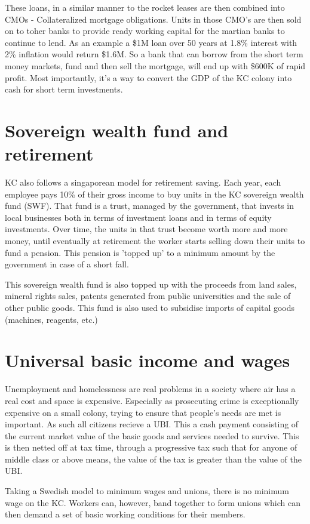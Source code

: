 \documentclass[10pt]{article}
\begin{document}
These loans, in a similar manner to the rocket leases are then combined into CMOs - Collateralized mortgage obligations. Units in those CMO's are then sold on to toher banks to provide ready working capital for the martian banks to continue to lend. As an example a \$1M loan over 50 years at 1.8\% interest with 2\% inflation would return \$1.6M. So a bank that can borrow from the short term money markets, fund and then sell the mortgage, will end up with \$600K of rapid profit. Most importantly, it's a way to convert the GDP of the KC colony into cash for short term investments.

\section{Sovereign wealth fund and retirement}
KC also follows a singaporean model for retirement saving. Each year, each employee pays 10\% of their gross income to buy units in the KC sovereign wealth fund (SWF). That fund is a trust, managed by the government, that invests in local businesses both in terms of investment loans and in terms of equity investments. Over time, the units in that trust become worth more and more money, until eventually at retirement the worker starts selling down their units to fund a pension. This pension is 'topped up' to a minimum amount by the government in case of a short fall.

This sovereign wealth fund is also topped up with the proceeds from land sales, mineral rights sales, patents generated from public universities and the sale of other public goods. This fund is also used to subsidise imports of capital goods (machines, reagents, etc.)

\section{Universal basic income and wages}
Unemployment and homelessness are real problems in a society where air has a real cost and space is expensive. Especially as prosecuting crime is exceptionally expensive on a small colony, trying to ensure that people's needs are met is important. As such all citizens recieve a UBI. This a cash payment consisting of the current market value of the basic goods and services needed to survive. This is then netted off at tax time, through a progressive tax such that for anyone of middle class or above means, the value of the tax is greater than the value of the UBI. 

Taking a Swedish model to minimum wages and unions, there is no minimum wage on the KC. Workers can, however, band together to form unions which can then demand a set of basic working conditions for their members.
\end{document}
